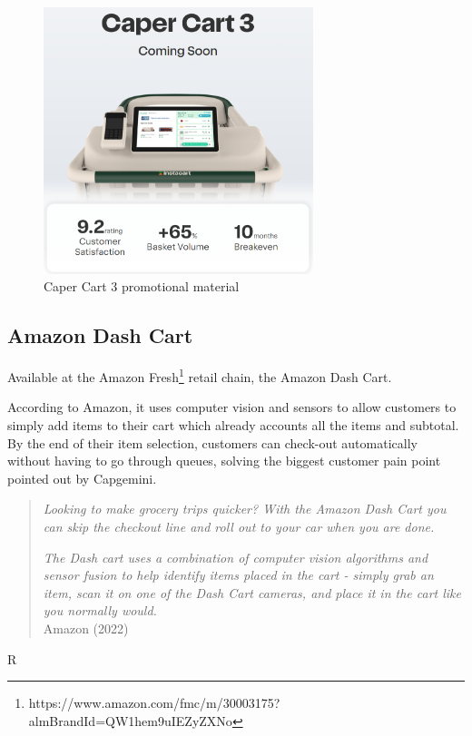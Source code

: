 \documentclass[openright]{normas-utf-tex} %
\begin{document}
\begin{figure}[H]
	\centering
	\includegraphics[width=0.7\textwidth]{./images/capercart3.png}
	\caption[Caper Cart 3 promotional material]{Caper Cart 3 promotional material}
	\label{fig:nextop}
\end{figure}


\subsection{Amazon Dash Cart}

Available at the Amazon Fresh\footnote{https://www.amazon.com/fmc/m/30003175?almBrandId=QW1hem9uIEZyZXNo} retail chain, the
Amazon Dash Cart.

According to Amazon, it uses computer vision and sensors to allow customers to
simply add items to their cart which already accounts all the items and
subtotal. By the end of their item selection, customers can check-out
automatically without having to go through queues, solving the biggest customer
pain point pointed out by Capgemini.

\begin{quote}
\textit{Looking to make grocery trips quicker? With the Amazon Dash Cart you can skip the checkout line and roll out to your car when you are done.}

\textit{The Dash cart uses a combination of computer vision algorithms and sensor fusion to help identify items placed in the cart - simply grab an item, scan it on one of the Dash Cart cameras, and place it in the cart like you normally would.}
\\
Amazon (2022)
\end{quote}R
\end{document}
